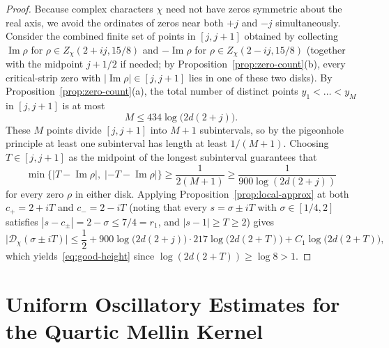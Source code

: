 \documentclass[11pt,reqno]{amsart}
\numberwithin{equation}{section}
\theoremstyle{definition}
\newcommand{\1}{\mathbf{1}}
\newcommand{\D}{\mathcal{D}}
\renewcommand{\Im}{\operatorname{Im}}
\begin{document}
\begin{proof}
Because complex characters $\chi$ need not have zeros symmetric about the real axis, we avoid the ordinates of zeros near both $+j$ and $-j$ simultaneously. Consider the combined finite set of points in $[j, j+1]$ obtained by collecting $\Im \rho$ for $\rho \in Z_\chi(2 + ij, 15/8)$ and $-\Im \rho$ for $\rho \in Z_\chi(2 - ij, 15/8)$ (together with the midpoint $j + 1/2$ if needed; by Proposition~\ref{prop:zero-count}(b), every critical-strip zero with $|\Im \rho| \in [j, j+1]$ lies in one of these two disks). By Proposition~\ref{prop:zero-count}(a), the total number of distinct points $y_1 < \dots < y_M$ in $[j, j+1]$ is at most
\[
  M \le 434 \log\bigl(2 d (2 + j)\bigr).
\]
These $M$ points divide $[j, j+1]$ into $M + 1$ subintervals, so by the pigeonhole principle at least one subinterval has length at least $1/(M+1)$. Choosing $T \in [j, j+1]$ as the midpoint of the longest subinterval guarantees that
\[
  \min\bigl\{|T - \Im \rho|,\; |-T - \Im \rho|\bigr\} \ge \frac{1}{2(M+1)} \ge \frac{1}{900 \log(2d(2+j))}
\]
for every zero $\rho$ in either disk. Applying Proposition~\ref{prop:local-approx} at both $c_+ = 2 + iT$ and $c_- = 2 - iT$ (noting that every $s = \sigma \pm iT$ with $\sigma \in [1/4, 2]$ satisfies $|s - c_\pm| = 2 - \sigma \le 7/4 = r_1$, and $|s - 1| \ge T \ge 2$) gives
\[
  \bigl|\D_\chi(\sigma \pm iT)\bigr|
  \le \frac{1}{2} + 900 \log\bigl(2d(2+j)\bigr) \cdot 217 \log\bigl(2d(2+T)\bigr) + C_1 \log\bigl(2d(2+T)\bigr),
\]
which yields~\eqref{eq:good-height} since $\log(2d(2+T)) \ge \log 8 > 1$.
\end{proof}

\section{Uniform Oscillatory Estimates for the Quartic Mellin Kernel}
\label{sec:quartic-mellin}
\end{document}
